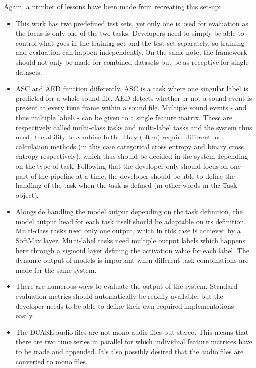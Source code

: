 Again, a number of lessons have been made from recreating this set-up:

\begin{itemize}
	\item This work has two predefined test sets, yet only one is used for evaluation as the focus is only one of the two tasks. Developers need to simply be able to control what goes in the training set and the test set separately, so training and evaluation can happen independently. On the same note, the framework should not only be made for combined datasets but be as receptive for single datasets.
	\item ASC and AED function differently. ASC is a task where one singular label is predicted for a whole sound file. AED detects whether or not a sound event is present at every time frame within a sound file. Multiple sound events - and thus multiple labels - can be given to a single feature matrix. These are respectively called multi-class tasks and multi-label tasks and the system thus needs the ability to combine both. They (often) require different loss calculation methods (in this case categorical cross entropy and binary cross entropy respectively), which thus should be decided in the system depending on the type of task. Following that the developer only should focus on one part of the pipeline at a time, the developer should be able to define the handling of the task when the task is defined (in other words in the Task object).
	\item Alongside handling the model output depending on the task definition, the model output head for each task itself should be adaptable on its definition. Multi-class tasks need only one output, which in this case is achieved by a SoftMax layer. Multi-label  tasks need multiple output labels which happens here through a sigmoid layer defining the activation value for each label. The dynamic output of models is important when different task combinations are made for the same system.
	\item There are numerous ways to evaluate the output of the system. Standard evaluation metrics should automatically be readily available, but the developer needs to be able to define their own required implementations easily. 
	\item The DCASE audio files are not mono audio files but stereo. This means that there are two time series in parallel for which individual feature matrices have to be made and appended. It's also possibly desired that the audio files are converted to mono files.
\end{itemize}

